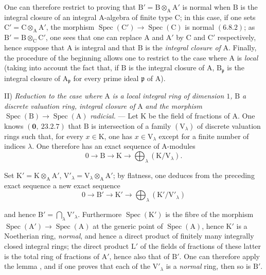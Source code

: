 One can therefore restrict to proving that $\mathrm{B}'=\mathrm{B}\otimes_\mathrm{A}\mathrm{A}'$ is normal when $\mathrm{B}$
is the integral closure of an integral $\mathrm{A}$-algebra of finite type $\mathrm{C}$; in this case, if one sets
$\mathrm{C}'=\mathrm{C}\otimes_\mathrm{A}\mathrm{A}'$, the morphism $\operatorname{Spec}(\mathrm{C}')\to\operatorname{Spec}(\mathrm{C})$ is normal $(6.8.2)$; as
$\mathrm{B}'=\mathrm{B}\otimes_\mathrm{C}\mathrm{C}'$,
one sees that one can replace $\mathrm{A}$ and $\mathrm{A}'$ by $\mathrm{C}$ and $\mathrm{C}'$ respectively, hence suppose that $\mathrm{A}$
is integral and that $\mathrm{B}$ is the \emph{integral closure of} $\mathrm{A}$. Finally, the procedure of the beginning allows one to
restrict to the case where $\mathrm{A}$ is \emph{local} (taking into account the fact that, if $\mathrm{B}$ is the integral closure of $\mathrm{A}$,
$\mathrm{B}_\mathfrak{p}$ is the integral closure of $\mathrm{A}_\mathfrak{p}$ for every prime ideal $\mathfrak{p}$ of $\mathrm{A}$).

II) \emph{Reduction to the case where} $\mathrm{A}$ \emph{is a local integral ring of dimension $1$,} $\mathrm{B}$ \emph{a discrete
valuation ring, integral closure of} $\mathrm{A}$ \emph{and the morphism} $\operatorname{Spec}(\mathrm{B})\to\operatorname{Spec}(\mathrm{A})$ \emph{radicial.} ---
Let $\mathrm{K}$ be the field of fractions of $\mathrm{A}$. One knows $(\mathbf{0},~23.2.7)$ that $\mathrm{B}$ is intersection of a
family $(\mathrm{V}_\lambda)$ of discrete valuation rings such that, for every $x\in\mathrm{K}$, one has $x\in\mathrm{V}_\lambda$
except for a finite number of indices $\lambda$. One therefore has an exact sequence of $\mathrm{A}$-modules
\[
  0\to\mathrm{B}\to\mathrm{K}\to\bigoplus_\lambda(\mathrm{K}/\mathrm{V}_\lambda).
\]

Set $\mathrm{K}'=\mathrm{K}\otimes_\mathrm{A}\mathrm{A}'$, $\mathrm{V}'_\lambda=\mathrm{V}_\lambda\otimes_\mathrm{A}\mathrm{A}'$; by flatness, one deduces from the preceding
exact sequence a new exact sequence
\[
  0\to\mathrm{B}'\to\mathrm{K}'\to\bigoplus_\lambda(\mathrm{K}'/\mathrm{V}'_\lambda)
\]


and hence $\mathrm{B}'=\bigcap_\lambda\mathrm{V}'_\lambda$. Furthermore $\operatorname{Spec}(\mathrm{K}')$ is the fibre of the morphism $\operatorname{Spec}(\mathrm{A}')\to\operatorname{Spec}(\mathrm{A})$
at the generic point of $\operatorname{Spec}(\mathrm{A})$, hence $\mathrm{K}'$ is a Noetherian ring, \emph{normal}, and hence
a direct product of finitely many integrally closed integral rings; the direct product
$\mathrm{L}'$ of the fields of fractions of these latter is the total ring of fractions of $\mathrm{A}'$,
hence also that of $\mathrm{B}'$. One can therefore apply the lemma , and if one proves
that each of the $\mathrm{V}'_\lambda$ is a \emph{normal} ring, then so is $\mathrm{B}'$.

